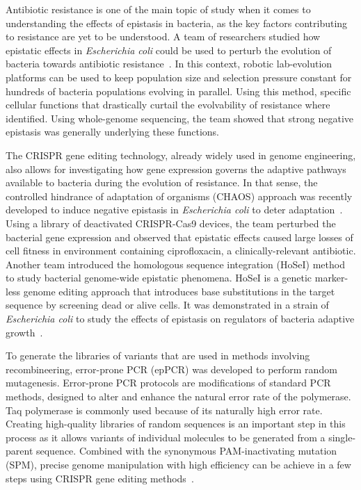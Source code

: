 \documentclass[12pt]{article}
\begin{document}
  Antibiotic resistance is one of the main topic of study when it
  comes to understanding the effects of epistasis in bacteria, as the key
  factors contributing to resistance are yet to be understood. A team of
  researchers studied how epistatic effects in \textit{Escherichia coli} could
  be used to perturb the evolution of bacteria towards antibiotic
  resistance~\cite{lukacisinova2019exploiting}. In this context, robotic
  lab-evolution platforms can be used to keep population size and selection
  pressure constant for hundreds of bacteria populations evolving in parallel.
  Using this method, specific cellular functions that drastically curtail the
  evolvability of resistance where identified. Using whole-genome sequencing,
  the team showed that strong negative epistasis was generally underlying these
  functions.

  The CRISPR gene editing technology, already widely used in genome
  engineering, also allows for investigating how gene expression governs the
  adaptive pathways available to bacteria during the evolution of resistance.
  In that sense, the controlled hindrance of adaptation of organisms (CHAOS)
  approach was recently developed to induce negative epistasis in
  \textit{Escherichia coli} to deter adaptation~\cite{otoupal2018}. Using a
  library of deactivated CRISPR-Cas9 devices, the team perturbed the bacterial
  gene expression and observed that epistatic effects caused large losses of
  cell fitness in environment containing ciprofloxacin, a clinically-relevant
  antibiotic. Another team introduced the homologous sequence integration
  (HoSeI) method to study bacterial genome-wide epistatic phenomena. HoSeI is a
  genetic marker-less genome editing approach that introduces base
  substitutions in the target sequence by screening dead or alive cells. It was
  demonstrated in a strain of \textit{Escherichia coli} to study the effects of
  epistasis on regulators of bacteria adaptive
  growth~\cite{miyake2020epistatic}.

  To generate the libraries of variants that are used in methods involving
  recombineering, error-prone PCR (epPCR) was developed to perform random
  mutagenesis. Error-prone PCR protocols are modifications of standard PCR
  methods, designed to alter and enhance the natural error rate of the
  polymerase. Taq polymerase is commonly used because
  of its naturally high error rate. Creating high-quality libraries of random
  sequences is an important step in this process as it allows variants of
  individual molecules to be generated from a single-parent sequence. Combined
  with the synonymous PAM-inactivating mutation (SPM), precise genome
  manipulation with high efficiency can be achieve in a few steps using CRISPR
  gene editing methods~\cite{arnold2003directed}. 
\end{document}
